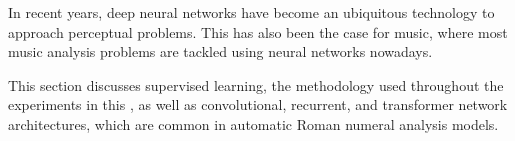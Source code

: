 

In recent years, deep neural networks have become an
ubiquitous technology to approach perceptual problems. This
has also been the case for music, where most music analysis
problems are tackled using neural networks nowadays.

This section discusses supervised learning, the methodology used throughout the experiments in this \thesisdiss, as well as convolutional, recurrent, and transformer network architectures, which are common in automatic Roman numeral analysis models.
